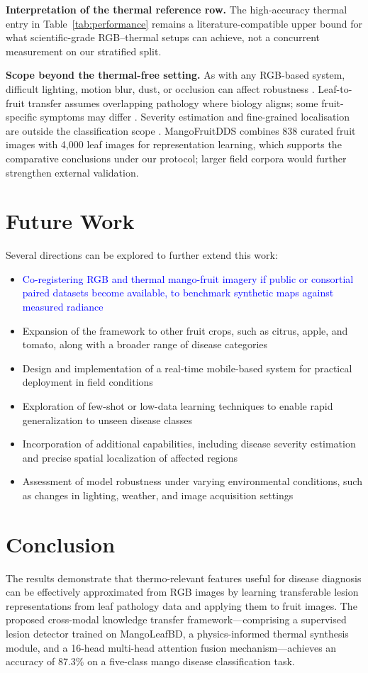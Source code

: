 \documentclass[utf8]{FrontiersinHarvard} %
\begin{document}
\textbf{Interpretation of the thermal reference row.} The high-accuracy thermal entry in Table~\ref{tab:performance} remains a literature-compatible upper bound for what scientific-grade RGB--thermal setups can achieve, not a concurrent measurement on our stratified split.

\textbf{Scope beyond the thermal-free setting.} As with any RGB-based system, difficult lighting, motion blur, dust, or occlusion can affect robustness \cite{kouidri2021}. Leaf-to-fruit transfer assumes overlapping pathology where biology aligns; some fruit-specific symptoms may differ \cite{weiss2016}. Severity estimation and fine-grained localisation are outside the classification scope \cite{wang2022_synthetic}. MangoFruitDDS combines 838 curated fruit images with 4{,}000 leaf images for representation learning, which supports the comparative conclusions under our protocol; larger field corpora would further strengthen external validation.

\endgroup

\section{Future Work}
Several directions can be explored to further extend this work:
\begin{itemize}
    \item \textcolor{blue}{Co-registering RGB and thermal mango-fruit imagery if public or consortial paired datasets become available, to benchmark synthetic maps against measured radiance}
    \item Expansion of the framework to other fruit crops, such as citrus, apple, and tomato, along with a broader range of disease categories
    \item Design and implementation of a real-time mobile-based system for practical deployment in field conditions
    \item Exploration of few-shot or low-data learning techniques to enable rapid generalization to unseen disease classes
    \item Incorporation of additional capabilities, including disease severity estimation and precise spatial localization of affected regions
    \item Assessment of model robustness under varying environmental conditions, such as changes in lighting, weather, and image acquisition settings
\end{itemize}

\FloatBarrier
\section{Conclusion}
The results demonstrate that thermo-relevant features useful for disease diagnosis can be effectively approximated from RGB images by learning transferable lesion representations from leaf pathology data and applying them to fruit images. The proposed cross-modal knowledge transfer framework—comprising a supervised lesion detector trained on MangoLeafBD, a physics-informed thermal synthesis module, and a 16-head multi-head attention fusion mechanism—achieves an accuracy of 87.3\% on a five-class mango disease classification task.
\end{document}
